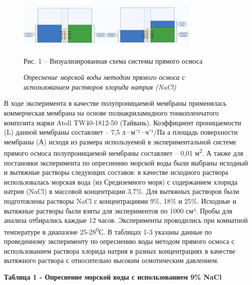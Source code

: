 \begin{figure}[H]
	\centering
	\includegraphics[width=0.8\textwidth]{media/chem/image26}
	\caption*{Рис. 1 -- Визуализированная схема системы прямого осмоса}
	\caption*{\emph{Опреснение морской воды методом прямого осмоса с использованием растворов хлорида натрия (NaCl)}}
\end{figure}

В ходе эксперимента в качестве полупроницаемой мембраны применялась
коммерческая мембрана на основе полиакриламидного тонкопленчатого
композита марки Atoll TW40-1812-50 (Тайвань). Коэффициент проницаемости
(L) данной мембраны составляет -- 7,5 л·м⁻²·ч⁻¹/Па а площадь поверхности
мембраны (А) исходя из размера используемой в экспериментальной системе
прямого осмоса полупроницаемой мембраны составляет -- 0,01
м\textsuperscript{2}. А также для постановки эксперимента по опреснению
морской воды были выбраны исходный и вытяжные растворы следующих
составов: в качестве исходного раствора использовалась морская вода (из
Средиземного моря) с содержанием хлорида натрия (NaCl) в массовой
концентрации 3,7\%. Для вытяжных растворов были подготовлены растворы
NaCl с концентрациями 9\%, 18\% и 25\%. Исходные и вытяжные растворы
были взяты для экспериментов по 1000 см³. Пробы для анализа отбирались
каждые 12 часов. Эксперименты проводились при комнатной температуре в
диапазоне 25-28\textsuperscript{0}С. В таблицах 1-3 указаны данные по
проведенному эксперименту по опреснению воды методом прямого осмоса с
использованием раствора хлорида натрия в разных концентрациях в качестве
вытяжного раствора с относительно высоким осмотическим давлением.

{\bfseries Таблица 1 - Опреснение морской воды с использованием 9\% NaCl}


